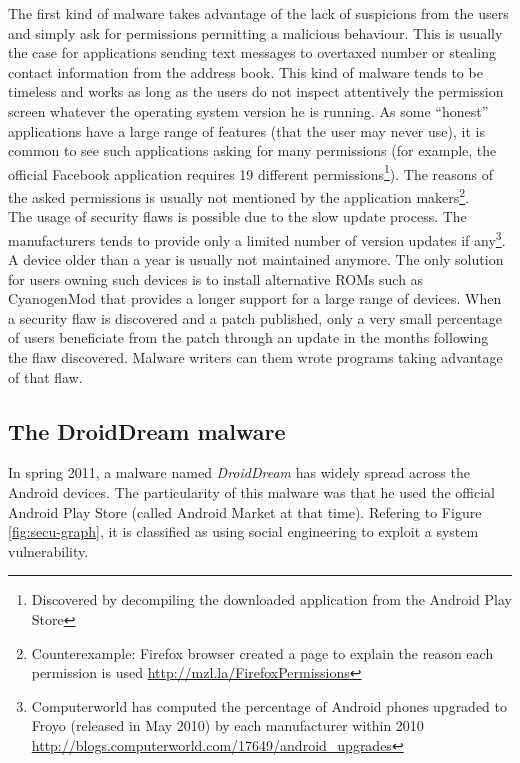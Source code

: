 The first kind of malware takes advantage of the lack of suspicions from the users and simply ask for permissions permitting a malicious behaviour.
This is usually the case for applications sending text messages to overtaxed number or stealing contact information from the address book.
This kind of malware tends to be timeless and works as long as the users do not inspect attentively the permission screen whatever the operating system version he is running.
As some ``honest'' applications have a large range of features (that the user may never use), it is common to see such applications asking for many permissions (for example, the official Facebook application requires 19 different permissions\footnote{Discovered by decompiling the downloaded application from the Android Play Store}).
The reasons of the asked permissions is usually not mentioned by the application makers\footnote{Counterexample: Firefox browser created a page to explain the reason each permission is used \url{http://mzl.la/FirefoxPermissions}}.\\

The usage of security flaws is possible due to the slow update process.
The manufacturers tends to provide only a limited number of version updates if any\footnote{Computerworld has computed the percentage of Android phones upgraded to Froyo (released in May 2010) by each manufacturer within 2010 \url{http://blogs.computerworld.com/17649/android_upgrades}}.
A device older than a year is usually not maintained anymore.
The only solution for users owning such devices is to install alternative ROMs such as CyanogenMod that provides a longer support for a large range of devices.
When a security flaw is discovered and a patch published, only a very small percentage of users beneficiate from the patch through an update in the months following the flaw discovered.
Malware writers can them wrote programs taking advantage of that flaw.\\

\subsection{The DroidDream malware}

In spring 2011, a malware named \emph{DroidDream} has widely spread across the Android devices.
The particularity of this malware was that he used the official Android Play Store (called Android Market at that time).
Refering to Figure \ref{fig:secu-graph}, it is classified as using social engineering to exploit a system vulnerability.\\

